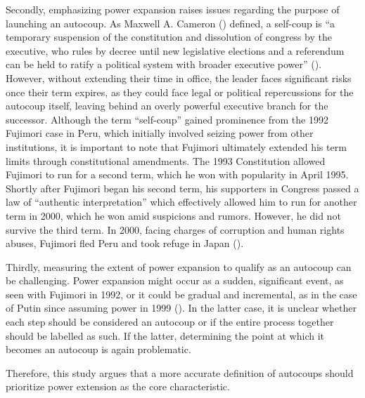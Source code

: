 \documentclass[
  12pt,
]{report}
\begin{document}
Secondly, emphasizing power expansion raises issues regarding the
purpose of launching an autocoup. As Maxwell A. Cameron
() defined, a self-coup is ``a
temporary suspension of the constitution and dissolution of congress by
the executive, who rules by decree until new legislative elections and a
referendum can be held to ratify a political system with broader
executive power'' (). However, without extending their time in office, the leader faces
significant risks once their term expires, as they could face legal or
political repercussions for the autocoup itself, leaving behind an
overly powerful executive branch for the successor. Although the term
``self-coup'' gained prominence from the 1992 Fujimori case in Peru,
which initially involved seizing power from other institutions, it is
important to note that Fujimori ultimately extended his term limits
through constitutional amendments. The 1993 Constitution allowed
Fujimori to run for a second term, which he won with popularity in April
1995. Shortly after Fujimori began his second term, his supporters in
Congress passed a law of ``authentic interpretation'' which effectively
allowed him to run for another term in 2000, which he won amid
suspicions and rumors. However, he did not survive the third term. In
2000, facing charges of corruption and human rights abuses, Fujimori
fled Peru and took refuge in Japan ().

Thirdly, measuring the extent of power expansion to qualify as an
autocoup can be challenging. Power expansion might occur as a sudden,
significant event, as seen with Fujimori in 1992, or it could be gradual
and incremental, as in the case of Putin since assuming power in 1999
(). In the latter case, it is
unclear whether each step should be considered an autocoup or if the
entire process together should be labelled as such. If the latter,
determining the point at which it becomes an autocoup is again
problematic.

Therefore, this study argues that a more accurate definition of
autocoups should prioritize power extension as the core characteristic.
\end{document}
